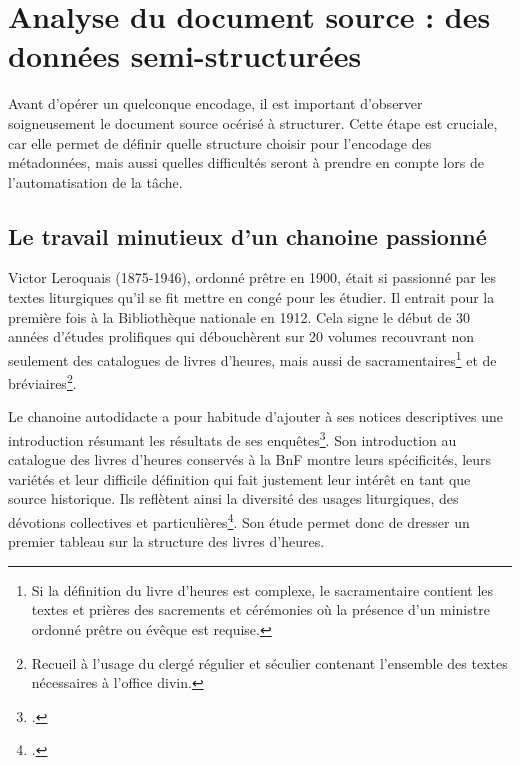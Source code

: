 \documentclass[a4paper,12pt,twoside]{book}
\begin{document}
	\section{Analyse du document source : des données semi-structurées}
	
	Avant d'opérer un quelconque encodage, il est important d'observer soigneusement le document source océrisé à structurer. Cette étape est cruciale, car elle permet de définir quelle structure choisir pour l'encodage des métadonnées, mais aussi quelles difficultés seront à prendre en compte lors de l'automatisation de la tâche. 
	
	\subsection{\label{Leroquais}Le travail minutieux d’un chanoine passionné}
	
	Victor Leroquais (1875-1946), ordonné prêtre en 1900, était si passionné par les textes liturgiques qu'il se fit mettre en congé pour les étudier. Il entrait pour la première fois à la Bibliothèque nationale en 1912. Cela signe le début de 30 années d'études prolifiques qui débouchèrent sur 20 volumes recouvrant non seulement des catalogues de livres d'heures, mais aussi de sacramentaires\footnote{Si la définition du livre d'heures est complexe, le sacramentaire contient les textes et prières des sacrements et cérémonies où la présence d'un ministre ordonné prêtre ou évêque est requise.} et de bréviaires\footnote{Recueil à l'usage du clergé régulier et séculier contenant l'ensemble des textes nécessaires à l'office divin.}.
	
	Le chanoine autodidacte a pour habitude d'ajouter à ses notices descriptives une introduction résumant les résultats de ses enquêtes\footcite{V_L}. Son introduction au catalogue des livres d'heures conservés à la BnF montre leurs spécificités, leurs variétés et leur difficile définition qui fait justement leur intérêt en tant que source historique. Ils reflètent ainsi la diversité des usages liturgiques, des dévotions collectives et particulières\footcite[p. I-LXXXV]{Leroquais_notices}. Son étude permet donc de dresser un premier tableau sur la structure des livres d'heures.
	
\end{document}
